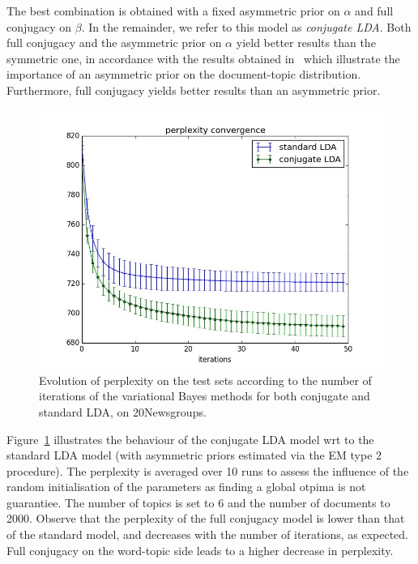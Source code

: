 The best combination is obtained with a fixed asymmetric prior on $\alpha$ and full conjugacy on $\beta$. In the remainder, we refer to this model as {\em conjugate LDA}. Both full conjugacy and the asymmetric prior on $\alpha$ yield better results than the symmetric one, in accordance with the results obtained in~\cite{wallach_rethinking_2009} which illustrate the importance of an asymmetric prior on the document-topic distribution. Furthermore, full conjugacy yields better results than an asymmetric prior.

\begin{figure}[ht]
\includegraphics[scale=0.4]{results/pp_conv}
\caption{\label{fig:pp-exple}Evolution of perplexity on the test sets according to the number of iterations of the variational Bayes methods for both conjugate and standard LDA, on 20Newsgroups.}
\end{figure}
Figure~\ref{fig:pp-exple} illustrates the behaviour of the conjugate LDA model wrt to the standard LDA model (with asymmetric priors estimated via the EM type 2 procedure). The perplexity is averaged over 10 runs to assess the influence of the random initialisation of the parameters as finding a global otpima is not guarantiee. The number of topics is set to 6 and the number of documents to 2000. Observe that the perplexity of the full conjugacy model is lower than that of the standard model, and decreases with the number of iterations, as expected. Full conjugacy on the word-topic side leads to a higher decrease in perplexity.

